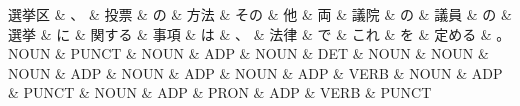 \documentclass[tikz,border=5pt]{standalone}
\begin{document}
\normalsize
\begin{dependency}[edge unit distance=12.0pt]
    \begin{deptext}[column sep=1em]
        選挙区 \& 、 \& 投票 \& の \& 方法 \& その \& 他 \& 両 \& 議院 \& の \& 議員 \& の \& 選挙 \& に \& 関する \& 事項 \& は \& 、 \& 法律 \& で \& これ \& を \& 定める \& 。\\
        NOUN \& PUNCT \& NOUN \& ADP \& NOUN \& DET \& NOUN \& NOUN \& NOUN \& ADP \& NOUN \& ADP \& NOUN \& ADP \& VERB \& NOUN \& ADP \& PUNCT \& NOUN \& ADP \& PRON \& ADP \& VERB \& PUNCT\\
    \end{deptext}
\end{dependency}
\end{document}
